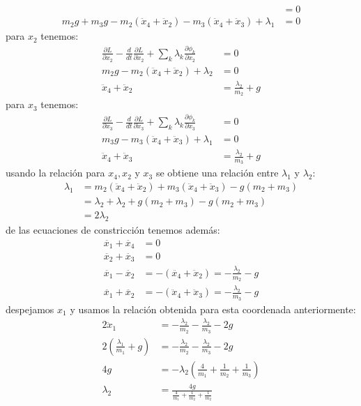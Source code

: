 \documentclass{article}
\begin{document}
\begin{tcolorbox}[breakable]
\begin{align*}
        &= 0  \\
        m_2g+m_3g - m_2(\ddot{x}_4+\ddot{x}_2) - m_3(\ddot{x}_4+\ddot{x}_3) + \lambda_1 &= 0
    \end{align*}
    para $x_2$ tenemos:
    \begin{align*}
        \frac{\partial L}{\partial x_2} 
        -\frac{d}{dt}\frac{\partial L}{\partial \dot{x}_2} 
        + \sum_k \lambda_k \frac{\partial \phi_k}{\partial x_2}
        &= 0  \\
        m_2g-m_2(\ddot{x}_4+\ddot{x}_2) + \lambda_2 &= 0 \\
        \ddot{x}_4+\ddot{x}_2 &= \frac{\lambda_2}{m_2} + g
    \end{align*}
    para $x_3$ tenemos:
    \begin{align*}
        \frac{\partial L}{\partial x_3} 
        -\frac{d}{dt}\frac{\partial L}{\partial \dot{x}_3} 
        + \sum_k \lambda_k \frac{\partial \phi_k}{\partial x_3}
        &= 0  \\
        m_3g - m_3(\ddot{x}_4+\ddot{x}_3) + \lambda_1 &= 0 \\
        \ddot{x}_4+ \ddot{x}_3 &= \frac{\lambda_2}{m_3}+g
    \end{align*}
    usando la relación para $x_4,x_2$ y $x_3$ se obtiene una relación entre $\lambda_1$ y $\lambda_2$:
    \begin{align*}
        \lambda_1 
        &= m_2(\ddot{x}_4+\ddot{x}_2) + m_3(\ddot{x}_4+\ddot{x}_3) - g(m_2+m_3) \\
        &= \lambda_2 + \lambda_2 + g(m_2+m_3) - g(m_2+m_3) \\
        &= 2\lambda_2 
    \end{align*}
    de las ecuaciones de constricción tenemos además:
    \begin{align*}
        \ddot{x_1}+\ddot{x_4} &= 0 \\
        \ddot{x_2}+\ddot{x_3} &= 0 \\ 
        \ddot{x_1}-\ddot{x_2} &= -(\ddot{x_4}+\ddot{x}_2) = -\tfrac{\lambda_2}{m_2}-g \\
        \ddot{x_1}+\ddot{x_2} &= -(\ddot{x}_4+\ddot{x}_3) = -\tfrac{\lambda_2}{m_3}-g 
    \end{align*}
    despejamos $x_1$ y usamos la relación obtenida para esta coordenada anteriormente:
    \begin{align*}
        2\ddot{x}_1 &= -\tfrac{\lambda_2}{m_2}-\tfrac{\lambda_2}{m_3}-2g \\
        2(\tfrac{\lambda_1}{m_1}+g) &= -\tfrac{\lambda_2}{m_2}-\tfrac{\lambda_2}{m_3}-2g \\
        4g &= -\lambda_2(\tfrac{4}{m_1}+\tfrac{1}{m_2}+\tfrac{1}{m_3}) \\
        \lambda_2 &= \frac{4g}{\tfrac{4}{m_1}+\tfrac{1}{m_2}+\tfrac{1}{m_2}} 
    \end{align*} 

\end{tcolorbox}
\end{document}
